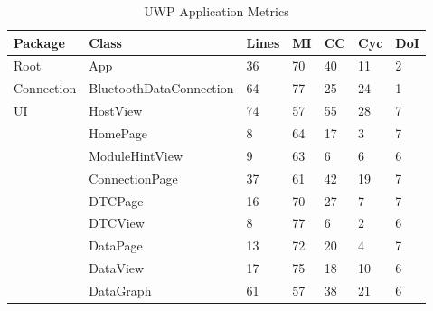 {{		\begin{table}[ht]
		\begin{scriptsize}			
			\begin{center}				
				\begin{tabularx}{\textwidth}{| l | X | l | l | l | l | l |}
								
				\hline
				\textbf{Package} & \textbf{Class} & \textbf{Lines} & \textbf{MI} & \textbf{CC} & \textbf{Cyc} & \textbf{DoI}\\
				\hline				
				Root & App & 36 & 70 & 40 & 11 & 2\\
				\hline
				Connection & BluetoothDataConnection & 64 & 77 & 25 & 24 & 1\\
				\hline
				\multirow{9}{*}{UI} & HostView & 74 & 57 & 55 & 28 & 7\\\cline{2-7}
									& HomePage & 8 & 64 & 17 & 3 & 7\\\cline{2-7}
									& ModuleHintView & 9 & 63 & 6 & 6 & 6\\\cline{2-7}
									& ConnectionPage & 37 & 61 & 42 & 19 & 7\\\cline{2-7}
									& DTCPage & 16 & 70 & 27 & 7 & 7\\\cline{2-7}
									& DTCView & 8 & 77 & 6 & 2 & 6\\\cline{2-7}
									& DataPage & 13 & 72 & 20 & 4 & 7\\\cline{2-7}
									& DataView & 17 & 75 & 18 & 10 & 6\\\cline{2-7}
									& DataGraph & 61 & 57 & 38 & 21 & 6\\\cline{2-7}
				\hline
				\end{tabularx}
				\caption{UWP Application Metrics}
				\label{tab:UWPApp}
			\end{center}
		\end{scriptsize}
		\end{table}		
		
		\begin{table}[ht]
		\begin{scriptsize}			
			\begin{center}				
				\begin{tabularx}{\textwidth}{| l | X | l | l | l | l | l |}
								

\end{tabularx}
\end{center}
\end{scriptsize}
\end{table}}}
